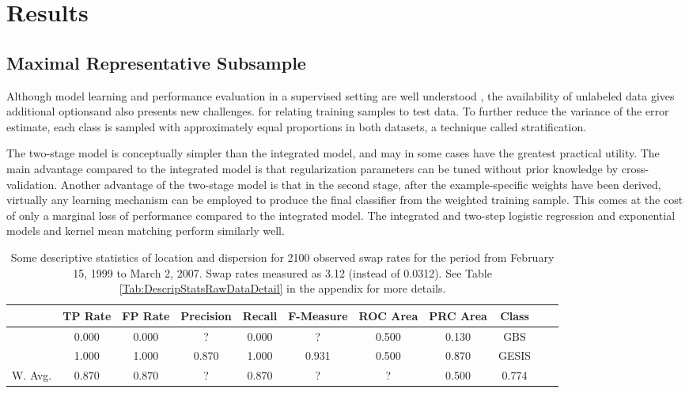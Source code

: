 \chapter{Results}\label{Sec:Results}

\section{Maximal Representative Subsample}

Although model learning and performance evaluation in a supervised setting are well understood \cite{hastie}, the availability of unlabeled data gives additional optionsand also presents new challenges.
for relating training samples to test data. To further reduce the variance of the error estimate, each class is sampled with approximately equal proportions in both datasets, a technique called stratiﬁcation. 

The two-stage model is conceptually simpler than the integrated model, and may in some cases have the greatest practical utility. The main advantage compared to the integrated model is that regularization parameters can be tuned without prior knowledge by cross-validation. Another advantage of the two-stage model is that in the second stage, after the example-speciﬁc weights have been derived, virtually any learning mechanism can be employed to produce the ﬁnal classiﬁer from the weighted training sample. This comes at the cost of only a marginal loss of performance compared to the integrated model. The integrated and two-step logistic regression and exponential models and kernel mean matching perform similarly well.

\begin{table}[ht]
    \begin{center}
		\captionsetup{width= 430pt}
            {\footnotesize
            \begin{tabular}{l|cccccccccc}
                \hline \hline
                           &  TP Rate & FP Rate & Precision & Recall & F-Measure & ROC Area & PRC Area & Class \\
                \hline
                      & 0.000 & 0.000 & ? & 0.000 & ? & 0.500 & 0.130 & GBS &\\
                      & 1.000 & 1.000 & 0.870 & 1.000 & 0.931 & 0.500 & 0.870 & GESIS &\\
                \hline \hline
		 W. Avg. & 0.870 & 0.870 & ? & 0.870 & ? & ? & 0.500 & 0.774 &
            \end{tabular}}
        \caption{Some descriptive statistics of location and dispersion for 2100 observed swap rates for the period from February 15, 1999 to March 2, 2007. Swap rates measured as 3.12 (instead of 0.0312). See Table \ref{Tab:DescripStatsRawDataDetail} in the appendix for more details.}
\label{Tab:DescripStatsRawData}
\end{center}
\end{table}

